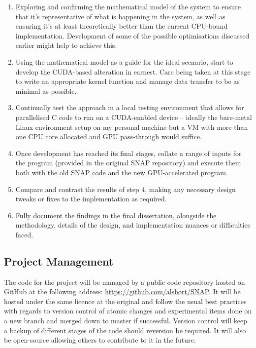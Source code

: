 \documentclass[conference]{IEEEtran}
\begin{document}
\begin{enumerate}

\item Exploring and confirming the mathematical model of the system to ensure that it’s representative of what is happening in the system, as well as ensuring it’s at least theoretically better than the current CPU-bound implementation. Development of some of the possible optimisations discussed earlier might help to achieve this.

\item Using the mathematical model as a guide for the ideal scenario, start to develop the CUDA-based alteration in earnest. Care being taken at this stage to write an appropriate kernel function and manage data transfer to be as minimal as possible.

\item Continually test the approach in a local testing environment that allows for parallelised C code to run on a CUDA-enabled device – ideally the bare-metal Linux environment setup on my personal machine but a VM with more than one CPU core allocated and GPU pass-through would suffice.

\item Once development has reached its final stages, collate a range of inputs for the program (provided in the original SNAP repository) and execute them both with the old SNAP code and the new GPU-accelerated program.

\item Compare and contrast the results of step 4, making any necessary design tweaks or fixes to the implementation as required.

\item Fully document the findings in the final dissertation, alongside the methodology, details of the design, and implementation nuances or difficulties faced.

\end{enumerate}


\subsection{Project Management}
The code for the project will be managed by a public code repository hosted on GitHub at the following address: \url{https://github.com/alshort/SNAP}. It will be hosted under the same licence at the original and follow the usual best practices with regards to version control of atomic changes and experimental items done on a new branch and merged down to master if successful. Version control will keep a backup of different stages of the code should reversion be required. It will also be open-source allowing others to contribute to it in the future.
\end{document}
